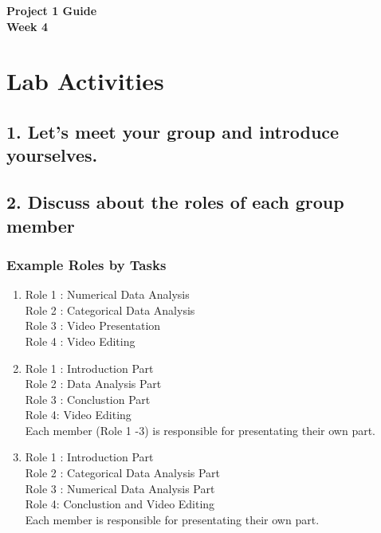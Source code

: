 \documentclass[12pt]{article}
\begin{document}
\begin{center}
\textbf{\Large Project 1 Guide \\ Week 4 } 
\end{center}




\section*{Lab Activities}

\subsection*{1. Let's meet your group and introduce yourselves.  } 

\vspace{6\baselineskip}



\subsection*{2. Discuss about the roles of each group member}

\subsubsection*{Example Roles by Tasks}
\begin{enumerate}
    \item Role 1 : Numerical Data Analysis \\
    Role 2 : Categorical Data Analysis \\
    Role 3 : Video Presentation \\
    Role 4 : Video Editing \\
    \item Role 1 : Introduction Part   \\
    Role 2 : Data Analysis Part \\
    Role 3 : Conclustion Part \\
    Role 4: Video Editing  \\
    Each member (Role 1 -3) is responsible for presentating their own part. \\
    \item Role 1 : Introduction Part   \\
    Role 2 :  Categorical Data Analysis  Part \\
    Role 3 : Numerical Data Analysis Part\\
    Role 4: Conclustion and Video Editing \\
    Each member is responsible for presentating their own part. \\
\end{enumerate}
\end{document}
